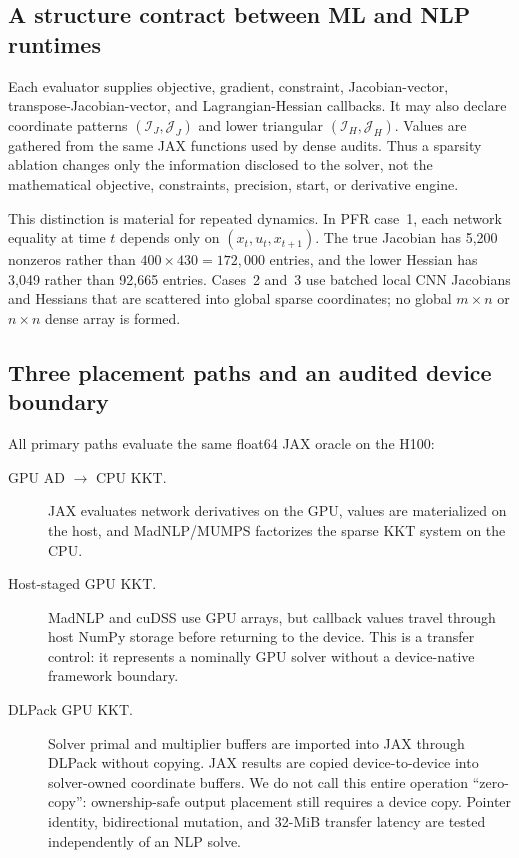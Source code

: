 \subsection{A structure contract between ML and NLP runtimes}

Each evaluator supplies objective, gradient, constraint, Jacobian-vector,
transpose-Jacobian-vector, and Lagrangian-Hessian callbacks.  It may
also declare coordinate patterns $(\mathcal{I}_J,\mathcal{J}_J)$ and lower
triangular $(\mathcal{I}_H,\mathcal{J}_H)$.  Values are gathered from the same
JAX functions used by dense audits.  Thus a sparsity ablation changes only the
information disclosed to the solver, not the mathematical objective,
constraints, precision, start, or derivative engine.

This distinction is material for repeated dynamics.  In PFR case~1, each
network equality at time $t$ depends only on $(x_t,u_t,x_{t+1})$.  The true
Jacobian has 5,200 nonzeros rather than $400\times430=172{,}000$ entries, and
the lower Hessian has 3,049 rather than 92,665 entries.  Cases~2 and~3 use
batched local CNN Jacobians and Hessians that are scattered into global sparse
coordinates; no global $m\times n$ or $n\times n$ dense array is formed.

\subsection{Three placement paths and an audited device boundary}
\label{sec:placement}

All primary paths evaluate the same float64 JAX oracle \citep{jax2018} on the H100:

\begin{description}
  \item[GPU AD $\rightarrow$ CPU KKT.] JAX evaluates network derivatives on
  the GPU, values are materialized on the host, and MadNLP/MUMPS factorizes the
  sparse KKT system on the CPU.

  \item[Host-staged GPU KKT.] MadNLP and cuDSS use GPU arrays, but callback
  values travel through host NumPy storage before returning to the device.
  This is a transfer control: it represents a nominally GPU solver without a
  device-native framework boundary.

  \item[DLPack GPU KKT.] Solver primal and multiplier buffers are imported into
  JAX through DLPack without copying.  JAX results are copied
  device-to-device into solver-owned coordinate buffers.  We do not call this
  entire operation ``zero-copy'': ownership-safe output placement still
  requires a device copy.  Pointer identity, bidirectional mutation, and
  32-MiB transfer latency are tested independently of an NLP solve.
\end{description}

